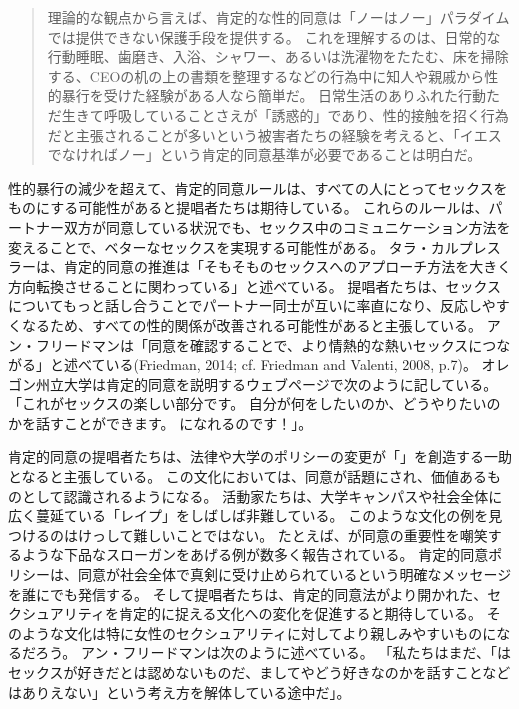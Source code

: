 \documentclass[paper=a4,book,openany]{jlreq} \usepackage{mystyle}
\begin{document}
\begin{quote}
  理論的な観点から言えば、肯定的な性的同意は「ノーはノー」パラダイムでは提供できない保護手段を提供する。
これを理解するのは、日常的な行動{\DDASH}睡眠、歯磨き、入浴、シャワー、あるいは洗濯物をたたむ、床を掃除する、CEOの机の上の書類を整理するなど{\DDASH}の行為中に知人や親戚から性的暴行を受けた経験がある人なら簡単だ。
日常生活のありふれた行動{\DDASH}ただ生きて呼吸していることさえ{\DDASH}が「誘惑的」であり、性的接触を招く行為だと主張されることが多いという被害者たちの経験を考えると、「イエスでなければノー」という肯定的同意基準が必要であることは明白だ。
\citep[p.405]{vandervort12:_affir_sexual_consen_canad_law}
\end{quote}

性的暴行の減少を超えて、肯定的同意ルールは、すべての人にとってセックスをものにする可能性があると提唱者たちは期待している。
これらのルールは、パートナー双方が同意している状況でも、セックス中のコミュニケーション方法を変えることで、ベターなセックスを実現する可能性がある。
タラ・カルプレスラーは、肯定的同意の推進は「そもそものセックスへのアプローチ方法を大きく方向転換させることに関わっている」と述べている。
提唱者たちは、セックスについてもっと話し合うことでパートナー同士が互いに率直になり、反応しやすくなるため、すべての性的関係が改善される可能性があると主張している。
アン・フリードマンは「同意を確認することで、より情熱的な熱いセックスにつながる」と述べている(Friedman, 2014; cf. Friedman and Valenti, 2008, p.7)。
\nocite{friedman14:_oh_yes_means_yes}\nocite{friedman08:_yes_means_yes}
オレゴン州立大学は肯定的同意を説明するウェブページで次のように記している。
「これがセックスの楽しい部分です。
自分が何をしたいのか、どうやりたいのかを話すことができます。
になれるのです！」\citep{moyer14:_how_calif_yes_means_yes}。

肯定的同意の提唱者たちは、法律や大学のポリシーの変更が「」を創造する一助となると主張している。
この文化においては、同意が話題にされ、価値あるものとして認識されるようになる。
活動家たちは、大学キャンパスや社会全体に広く蔓延ている「レイプ」をしばしば非難している。
このような文化の例を見つけるのはけっして難しいことではない。
たとえば、が同意の重要性を嘲笑するような下品なスローガンをあげる例が数多く報告されている\citep{jackson18:_frat_barred_yale_years_is_back}。
肯定的同意ポリシーは、同意が社会全体で真剣に受け止められているという明確なメッセージを誰にでも発信する。
そして提唱者たちは、肯定的同意法がより開かれた、セクシュアリティを肯定的に捉える文化への変化を促進すると期待している。
そのような文化は特に女性のセクシュアリティに対してより親しみやすいものになるだろう。
アン・フリードマンは次のように述べている。
「私たちはまだ、「はセックスが好きだとは認めないものだ、ましてやどう好きなのかを話すことなどはありえない」という考え方を解体している途中だ」\citep{friedman14:_oh_yes_means_yes}。
\end{document}
